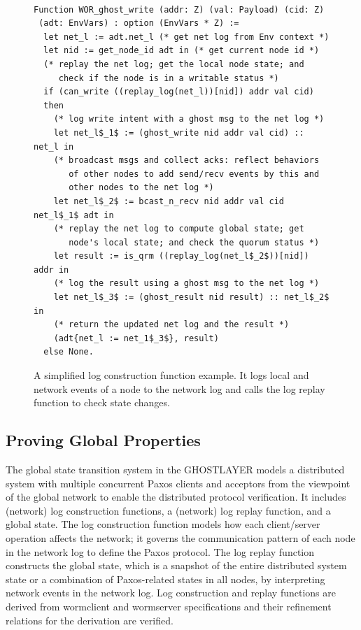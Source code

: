 \begin{figure} 

\begin{lstlisting}[language=mycoq, basicstyle=\small]%, basicstyle=\linespread{0.5}]

Function WOR_ghost_write (addr: Z) (val: Payload) (cid: Z)
 (adt: EnvVars) : option (EnvVars * Z) :=
  let net_l := adt.net_l (* get net log from Env context *)
  let nid := get_node_id adt in (* get current node id *)
  (* replay the net log; get the local node state; and
     check if the node is in a writable status *)
  if (can_write ((replay_log(net_l))[nid]) addr val cid)
  then
    (* log write intent with a ghost msg to the net log *)
    let net_l$_1$ := (ghost_write nid addr val cid) :: net_l in
    (* broadcast msgs and collect acks: reflect behaviors 
       of other nodes to add send/recv events by this and
       other nodes to the net log *)
    let net_l$_2$ := bcast_n_recv nid addr val cid net_l$_1$ adt in
    (* replay the net log to compute global state; get 
       node's local state; and check the quorum status *)
    let result := is_qrm ((replay_log(net_l$_2$))[nid]) addr in
    (* log the result using a ghost msg to the net log *)
    let net_l$_3$ := (ghost_result nid result) :: net_l$_2$ in
    (* return the updated net log and the result *)
    (adt{net_l := net_1$_3$}, result)
  else None.
\end{lstlisting}

\caption{A simplified log construction function example. It logs local and network events of a node to the network log and calls the log replay function to check state changes.}
\label{fig:spec}
\end{figure}

\subsection{Proving Global Properties}
\label{subsec:safety_verification}

	The global state transition system in the GHOSTLAYER models a distributed system with multiple concurrent Paxos clients and acceptors from the viewpoint of the global network to enable the distributed protocol verification. It includes (network) log construction functions, a (network) log replay function, and a global state. The log construction function models how each client/server operation affects the network; it governs the communication pattern of each node in the network log to define the Paxos protocol. The log replay function constructs the global state, which is a snapshot of the entire distributed system state or a combination of Paxos-related states in all nodes, by interpreting network events in the network log. Log construction and replay functions are derived from wormclient and wormserver specifications and their refinement relations for the derivation are verified. 


